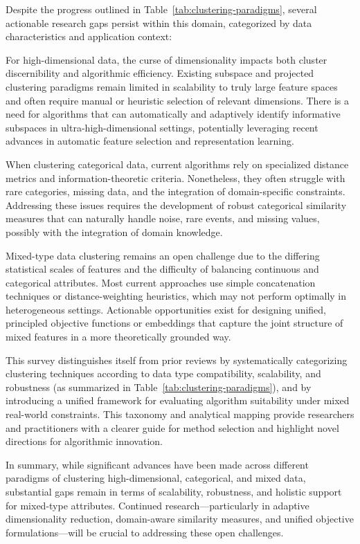 \documentclass[sigconf]{acmart}
\begin{document}
Despite the progress outlined in Table~\ref{tab:clustering-paradigms}, several actionable research gaps persist within this domain, categorized by data characteristics and application context:

For high-dimensional data, the curse of dimensionality impacts both cluster discernibility and algorithmic efficiency. Existing subspace and projected clustering paradigms remain limited in scalability to truly large feature spaces and often require manual or heuristic selection of relevant dimensions. There is a need for algorithms that can automatically and adaptively identify informative subspaces in ultra-high-dimensional settings, potentially leveraging recent advances in automatic feature selection and representation learning.

When clustering categorical data, current algorithms rely on specialized distance metrics and information-theoretic criteria. Nonetheless, they often struggle with rare categories, missing data, and the integration of domain-specific constraints. Addressing these issues requires the development of robust categorical similarity measures that can naturally handle noise, rare events, and missing values, possibly with the integration of domain knowledge.

Mixed-type data clustering remains an open challenge due to the differing statistical scales of features and the difficulty of balancing continuous and categorical attributes. Most current approaches use simple concatenation techniques or distance-weighting heuristics, which may not perform optimally in heterogeneous settings. Actionable opportunities exist for designing unified, principled objective functions or embeddings that capture the joint structure of mixed features in a more theoretically grounded way.

This survey distinguishes itself from prior reviews by systematically categorizing clustering techniques according to data type compatibility, scalability, and robustness (as summarized in Table~\ref{tab:clustering-paradigms}), and by introducing a unified framework for evaluating algorithm suitability under mixed real-world constraints. This taxonomy and analytical mapping provide researchers and practitioners with a clearer guide for method selection and highlight novel directions for algorithmic innovation.

In summary, while significant advances have been made across different paradigms of clustering high-dimensional, categorical, and mixed data, substantial gaps remain in terms of scalability, robustness, and holistic support for mixed-type attributes. Continued research—particularly in adaptive dimensionality reduction, domain-aware similarity measures, and unified objective formulations—will be crucial to addressing these open challenges.
\end{document}

